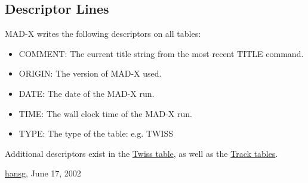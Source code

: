 




\subsection{Descriptor Lines}
  MAD-X writes the following descriptors on all tables: 
\begin{itemize}
	\item COMMENT: The current title string from the most recent TITLE command. 
	\item ORIGIN: The version of MAD-X used. 
	\item DATE: The date of the MAD-X run. 
	\item TIME: The wall clock time of the MAD-X run. 
	\item TYPE: The type of the table: e.g. TWISS 
\end{itemize} Additional descriptors exist in the \href{twiss_desc.html}{Twiss table}, as well as the \href{tables.html#track}{Track tables}. 

\href{http://www.cern.ch/Hans.Grote/hansg_sign.html}{hansg}, June 17, 2002 


